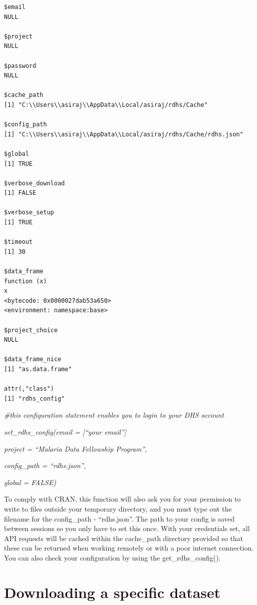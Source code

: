 \documentclass[
  letterpaper,
  DIV=11,
  numbers=noendperiod]{scrreprt}
\begin{document}
\begin{verbatim}
$email
NULL

$project
NULL

$password
NULL

$cache_path
[1] "C:\\Users\\asiraj\\AppData\\Local/asiraj/rdhs/Cache"

$config_path
[1] "C:\\Users\\asiraj\\AppData\\Local/asiraj/rdhs/Cache/rdhs.json"

$global
[1] TRUE

$verbose_download
[1] FALSE

$verbose_setup
[1] TRUE

$timeout
[1] 30

$data_frame
function (x) 
x
<bytecode: 0x0000027dab53a650>
<environment: namespace:base>

$project_choice
NULL

$data_frame_nice
[1] "as.data.frame"

attr(,"class")
[1] "rdhs_config"
\end{verbatim}

\emph{\#this configuration statement enables you to login to your DHS
account}

\emph{set\_rdhs\_config(email = {[}``your email''{]}}

\emph{project = ``Malaria Data Fellowship Program'',}

\emph{config\_path = ``rdhs.json'',}

\emph{global = FALSE)}

To comply with CRAN, this function will also ask you for your permission
to write to files outside your temporary directory, and you must type
out the filename for the config\_path - ``rdhs.json''. The path to your
config is saved between sessions so you only have to set this once. With
your credentials set, all API requests will be cached within the
cache\_path directory provided so that these can be returned when
working remotely or with a poor internet connection. You can also check
your configuration by using the get\_rdhs\_config().

\section{Downloading a specific
dataset}\label{downloading-a-specific-dataset}
\end{document}
